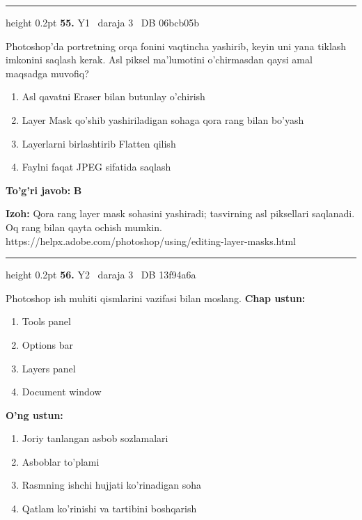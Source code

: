 \documentclass[10pt,a4paper,oneside]{article}
\begin{document}
\vspace{2mm}\hrule height 0.2pt \vspace{4mm}
\hypertarget{q55}{\textbf{\color{ink}55.}}  {\color{muted}\scriptsize Y1 \textbullet\ daraja 3 \textbullet\ DB 06bcb05b}
\par
Photoshop'da portretning orqa fonini vaqtincha yashirib, keyin uni yana tiklash imkonini saqlash kerak. Asl piksel ma'lumotini o'chirmasdan qaysi amal maqsadga muvofiq?
\begin{enumerate}[label=\Alph*),leftmargin=9mm]
\item Asl qavatni Eraser bilan butunlay o'chirish
\item Layer Mask qo'shib yashiriladigan sohaga qora rang bilan bo'yash
\item Layerlarni birlashtirib Flatten qilish
\item Faylni faqat JPEG sifatida saqlash
\end{enumerate}
\begin{tcolorbox}[enhanced,breakable,colback=teal!4,colframe=teal!45!black,boxrule=0.45pt,arc=1.2mm,left=2.8mm,right=2.8mm,top=2mm,bottom=2mm,before skip=2mm,after skip=2mm]
\textbf{\color{teal}To'g'ri javob:} \textbf{B}
\par\smallskip
\textbf{Izoh:} Qora rang layer mask sohasini yashiradi; tasvirning asl piksellari saqlanadi. Oq rang bilan qayta ochish mumkin. https://helpx.adobe.com/photoshop/using/editing-layer-masks.html
\end{tcolorbox}
\vspace{2mm}\hrule height 0.2pt \vspace{4mm}
\hypertarget{q56}{\textbf{\color{ink}56.}}  {\color{muted}\scriptsize Y2 \textbullet\ daraja 3 \textbullet\ DB 13f94a6a}
\par
Photoshop ish muhiti qismlarini vazifasi bilan moslang.
\textbf{\footnotesize Chap ustun:}
\begin{enumerate}[label=\arabic*),leftmargin=9mm]
\item Tools panel
\item Options bar
\item Layers panel
\item Document window
\end{enumerate}
\textbf{\footnotesize O'ng ustun:}
\begin{enumerate}[label=\Alph*),leftmargin=9mm]
\item Joriy tanlangan asbob sozlamalari
\item Asboblar to'plami
\item Rasmning ishchi hujjati ko'rinadigan soha
\item Qatlam ko'rinishi va tartibini boshqarish
\end{enumerate}
\end{document}
